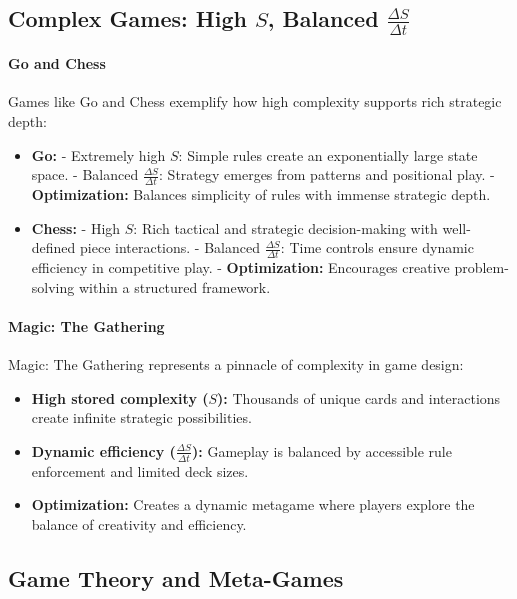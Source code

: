 \documentclass[12pt]{article}
\begin{document}
\subsection{Complex Games: High \(S\), Balanced \(\frac{\Delta S}{\Delta t}\)}

\paragraph{Go and Chess}
Games like Go and Chess exemplify how high complexity supports rich strategic depth:
\begin{itemize}
    \item \textbf{Go:}
        - Extremely high \(S\): Simple rules create an exponentially large state space.
        - Balanced \(\frac{\Delta S}{\Delta t}\): Strategy emerges from patterns and positional play.
        - \textbf{Optimization:} Balances simplicity of rules with immense strategic depth.
    \item \textbf{Chess:} 
        - High \(S\): Rich tactical and strategic decision-making with well-defined piece interactions.
        - Balanced \(\frac{\Delta S}{\Delta t}\): Time controls ensure dynamic efficiency in competitive play.
        - \textbf{Optimization:} Encourages creative problem-solving within a structured framework.
\end{itemize}

\paragraph{Magic: The Gathering}
Magic: The Gathering represents a pinnacle of complexity in game design:
\begin{itemize}
    \item \textbf{High stored complexity (\(S\)):} Thousands of unique cards and interactions create infinite strategic possibilities.
    \item \textbf{Dynamic efficiency (\(\frac{\Delta S}{\Delta t}\)):} Gameplay is balanced by accessible rule enforcement and limited deck sizes.
    \item \textbf{Optimization:} Creates a dynamic metagame where players explore the balance of creativity and efficiency.
\end{itemize}

\subsection{Game Theory and Meta-Games}
\end{document}
